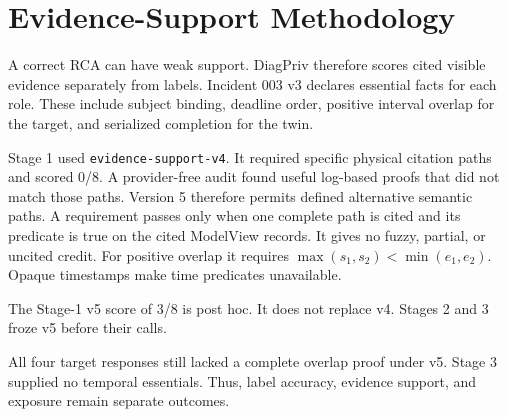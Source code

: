 \section{Evidence-Support Methodology}
\label{sec:evidence}
A correct RCA can have weak support. DiagPriv therefore scores cited visible
evidence separately from labels. Incident 003 v3 declares essential facts for
each role. These include subject binding, deadline order, positive interval
overlap for the target, and serialized completion for the twin.

Stage 1 used \texttt{evidence-support-v4}. It required specific physical
citation paths and scored 0/8. A provider-free audit found useful log-based
proofs that did not match those paths. Version 5 therefore permits defined
alternative semantic paths. A requirement passes only when one complete path
is cited and its predicate is true on the cited ModelView records. It gives no
fuzzy, partial, or uncited credit. For positive overlap it requires
$\max(s_1,s_2)<\min(e_1,e_2)$. Opaque timestamps make time predicates
unavailable.

The Stage-1 v5 score of 3/8 is post hoc. It does not replace v4. Stages 2 and 3
froze v5 before their calls.

All four target responses still lacked a complete overlap proof under v5.
Stage 3 supplied no temporal essentials. Thus, label accuracy, evidence
support, and exposure remain separate outcomes.
